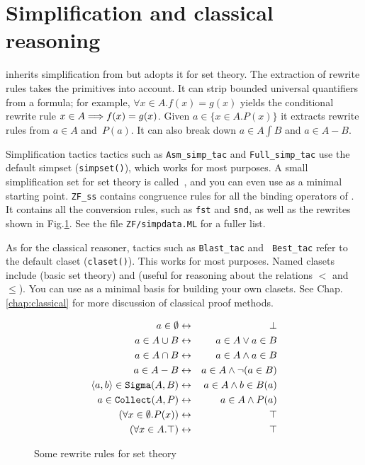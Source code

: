 \section{Simplification and classical reasoning}

{\ZF} inherits simplification from {\FOL} but adopts it for set theory.  The
extraction of rewrite rules takes the {\ZF} primitives into account.  It can
strip bounded universal quantifiers from a formula; for example, ${\forall
  x\in A. f(x)=g(x)}$ yields the conditional rewrite rule $x\in A \Longrightarrow
f(x)=g(x)$.  Given $a\in\{x\in A. P(x)\}$ it extracts rewrite rules from $a\in
A$ and~$P(a)$.  It can also break down $a\in A\int B$ and $a\in A-B$.

Simplification tactics tactics such as \texttt{Asm_simp_tac} and
\texttt{Full_simp_tac} use the default simpset (\texttt{simpset()}), which
works for most purposes.  A small simplification set for set theory is
called~, and you can even use  as a minimal
starting point.  \texttt{ZF_ss} contains congruence rules for all the binding
operators of {\ZF}\@.  It contains all the conversion rules, such as
\texttt{fst} and \texttt{snd}, as well as the rewrites shown in
Fig.\ts\ref{zf-simpdata}.  See the file \texttt{ZF/simpdata.ML} for a fuller
list.

As for the classical reasoner, tactics such as \texttt{Blast_tac} and {\tt
  Best_tac} refer to the default claset (\texttt{claset()}).  This works for
most purposes.  Named clasets include  (basic set theory)
and  (useful for reasoning about the relations $<$ and
$\le$).  You can use  as a minimal basis for building your own
clasets.  See %
{Chap.\ts\ref{chap:classical}} for more discussion of classical proof methods.


\begin{figure}
\begin{eqnarray*}
  a\in \emptyset        & \leftrightarrow &  \bot\\
  a \in A \cup B      & \leftrightarrow &  a\in A \vee a\in B\\
  a \in A \cap B      & \leftrightarrow &  a\in A \wedge a\in B\\
  a \in A-B             & \leftrightarrow &  a\in A \wedge \neg (a\in B)\\
  \langle a,b\rangle\in {\tt Sigma}(A,B)
                        & \leftrightarrow &  a\in A \wedge b\in B(a)\\
  a \in {\tt Collect}(A,P)      & \leftrightarrow &  a\in A \wedge P(a)\\
  (\forall x \in \emptyset. P(x)) & \leftrightarrow &  \top\\
  (\forall x \in A. \top)       & \leftrightarrow &  \top
\end{eqnarray*}
\caption{Some rewrite rules for set theory} \label{zf-simpdata}
\end{figure}



